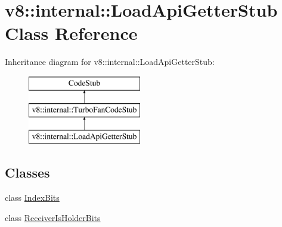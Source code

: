 \hypertarget{classv8_1_1internal_1_1_load_api_getter_stub}{}\section{v8\+:\+:internal\+:\+:Load\+Api\+Getter\+Stub Class Reference}
\label{classv8_1_1internal_1_1_load_api_getter_stub}
Inheritance diagram for v8\+:\+:internal\+:\+:Load\+Api\+Getter\+Stub\+:\begin{figure}[H]
\begin{center}
\leavevmode
\includegraphics[height=3.000000cm]{classv8_1_1internal_1_1_load_api_getter_stub}
\end{center}
\end{figure}
\subsection*{Classes}
\begin{DoxyCompactItemize}
\item 
class \hyperlink{classv8_1_1internal_1_1_load_api_getter_stub_1_1_index_bits}{Index\+Bits}
\item 
class \hyperlink{classv8_1_1internal_1_1_load_api_getter_stub_1_1_receiver_is_holder_bits}{Receiver\+Is\+Holder\+Bits}
\end{DoxyCompactItemize}
